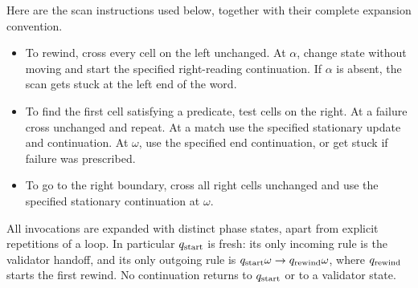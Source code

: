 Here are the scan instructions used below, together with their complete
expansion convention.
\begin{itemize}
\item To rewind, cross every cell on the left unchanged. At $\alpha$,
  change state without moving and start the specified right-reading
  continuation. If $\alpha$ is absent, the scan gets stuck at the left
  end of the word.
\item To find the first cell satisfying a predicate, test cells on the
  right. At a failure cross unchanged and repeat. At a match use the
  specified stationary update and continuation. At $\omega$, use the
  specified end continuation, or get stuck if failure was prescribed.
\item To go to the right boundary, cross all right cells unchanged and
  use the specified stationary continuation at $\omega$.
\end{itemize}
All invocations are expanded with distinct phase states, apart from
explicit repetitions of a loop. In particular $q_{\rm start}$ is fresh:
its only incoming rule is the validator handoff, and its only outgoing
rule is $q_{\rm start}\omega\to q_{\rm rewind}\omega$, where
$q_{\rm rewind}$ starts the first rewind. No continuation returns to
$q_{\rm start}$ or to a validator state.

